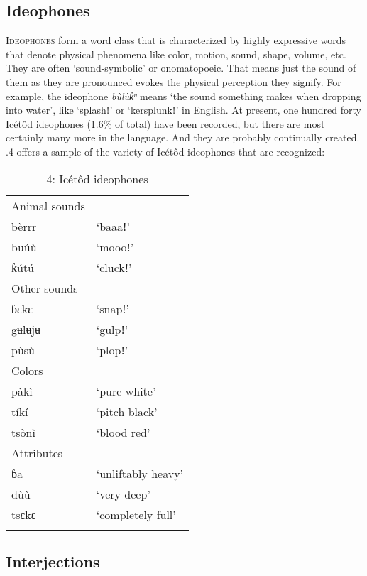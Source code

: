 \subsection{Ideophones}


\textsc{Ideophones} form a word class that is characterized by highly expressive words that denote physical phenomena like color, motion, sound, shape, volume, etc. They are often ‘sound-symbolic’ or onomatopoeic. That means just the sound of them as they are pronounced evokes the physical perception they signify. For example, the ideophone \textit{bùlùƙᵘ} means ‘the sound something makes when dropping into water’, like ‘splashǃ’ or ‘kersplunkǃ’ in English. At present, one hundred forty Icétôd ideophones (1.6\% of total) have been recorded, but there are most certainly many more in the language. And they are probably continually created. .4 offers a sample of the variety of Icétôd ideophones that are recognized:


\begin{table}
\caption{4: Icétôd ideophones}
\label{tab:3}


\begin{tabularx}{\textwidth}{XX}
\lsptoprule

Animal sounds & \\
bèrrr & ‘baaaǃ’\\
buúù & ‘moooǃ’\\
ƙútú & ‘cluckǃ’\\
Other sounds & \\
ɓɛkɛ & ‘snapǃ’\\
gʉlʉʝʉ & ‘gulpǃ’\\
pùsù & ‘plopǃ’\\
Colors & \\
pàkì & ‘pure white’\\
tíkí & ‘pitch black’\\
tsònì & ‘blood red’\\
Attributes & \\
ɓa & ‘unliftably heavy’\\
dùù & ‘very deep’\\
tsɛkɛ & ‘completely full’\\
\lspbottomrule
\end{tabularx}
\end{table}



\subsection{Interjections}


